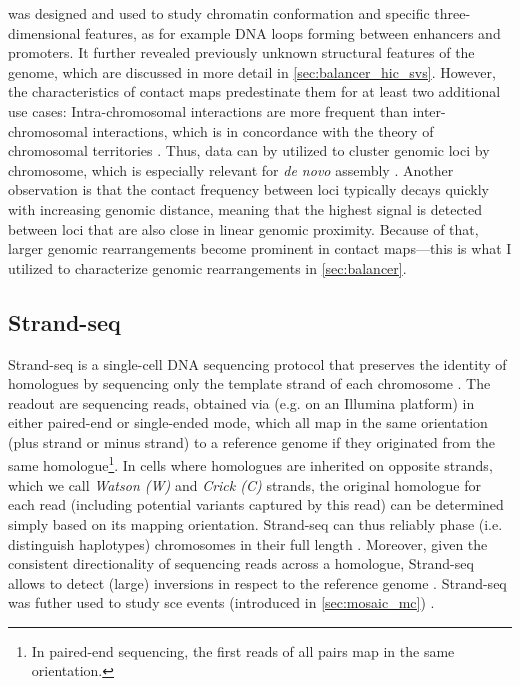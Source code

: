 
\hic was designed and used to study chromatin conformation and specific
three-dimensional features, as for example DNA loops forming between enhancers and
promoters. It further revealed previously unknown structural features of the
genome, which are discussed in more detail in \cref{sec:balancer_hic_svs}.
However, the characteristics of \hic contact maps predestinate them for at least
two additional use cases: Intra-chromosomal interactions are more frequent than
inter-chromosomal interactions, which is in concordance with the theory of
chromosomal territories \citep{Cremer2001}. Thus, \hic data can by utilized to
cluster genomic loci by chromosome, which is especially relevant for \textit{de
novo} assembly \citep{Burton2013}. Another observation is that the contact
frequency between loci typically decays quickly with increasing genomic
distance, meaning that the highest signal is detected between loci that are also
close in linear genomic proximity. Because of that, larger genomic
rearrangements become prominent in contact maps---this is what I utilized
to characterize genomic rearrangements in \cref{sec:balancer}.





\subsection{Strand-seq}
\label{sec:strandseq}

Strand-seq is a single-cell DNA sequencing protocol that preserves the identity
of homologues by sequencing only the template strand of each chromosome
\citep{Falconer2012,Sanders2017}. The readout are sequencing reads, obtained via
\mps (e.g. on an Illumina platform) in either paired-end or single-ended mode,
which all map in the same orientation (plus strand or minus strand) to a
reference genome if they originated from the same homologue\footnote{In paired-end
sequencing, the first reads of all pairs map in the same orientation.}. In cells where
homologues are inherited on opposite strands, which we call \emph{Watson (W)} and \emph{Crick (C)}
strands, the original homologue for each read (including potential variants
captured by this read) can be determined simply based
on its mapping orientation. Strand-seq can thus reliably phase (i.e. distinguish
haplotypes) chromosomes in their full length \citep{Porubsky2016}. Moreover,
given the consistent directionality of sequencing reads across a homologue,
Strand-seq allows to detect (large) inversions in respect to the reference
genome \citep{Sanders2016}. Strand-seq was futher used to study \acl{sce} events
(introduced in \cref{sec:mosaic_mc}) \citep{Falconer2012}.


